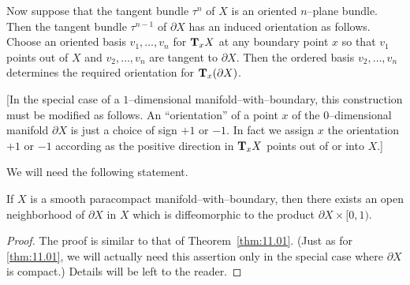 \documentclass[../main]{subfiles}
\begin{document}
Now suppose that the tangent bundle $\tau^n$ of $X$ is an oriented $n$--plane bundle. Then the tangent bundle $\tau^{n - 1}$ of $\partial X$ has an induced orientation as follows. Choose an oriented basis $v_1, \ldots, v_n$ for $\tangentspace X x$ at any boundary point $x$ so that $v_1$ points out of $X$ and $v_2, \ldots, v_n$ are tangent to $\partial X$. Then the ordered basis $v_2, \ldots, v_n$ determines the required orientation for $\tangentspace {(\partial X)} x$.

[In the special case of a $1$--dimensional manifold--with--boundary, this construction must be modified as follows. An ``orientation'' of a point $x$ of the $0$--dimensional manifold $\partial X$ is just a choice of sign $+1$ or $-1$. In fact we assign $x$ the orientation $+1$ or $-1$ according as the positive direction in $\tangentspace X x$ points out of or into $X$.]

We will need the following statement.
\begin{theorem}\label{thm:17.1}
If $X$ is a smooth paracompact manifold--with--boundary, then there exists an open neighborhood of $\partial X$ in $X$ which is diffeomorphic to the product $\partial X \times [0, 1)$.
\end{theorem}

\begin{proof}
The proof is similar to that of Theorem~\ref{thm:11.01}. (Just as for \ref{thm:11.01}, we will actually need this assertion only in the special case where $\partial X$ is compact.) Details will be left to the reader.
\end{proof}
\end{document}

